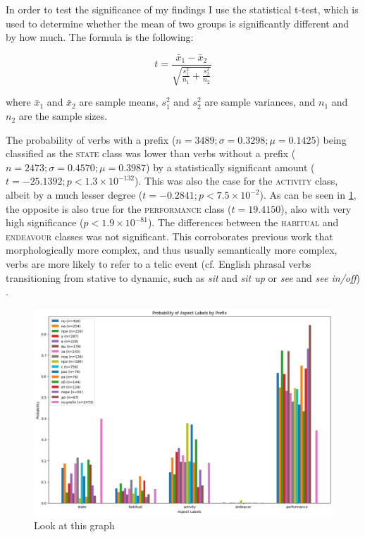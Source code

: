 In order to test the significance of my findings I use the statistical t-test, which is used to determine whether the mean of two groups is significantly different and by how much. The formula is the following:

$$t = \frac{\bar{x}_1 - \bar{x}_2}{\sqrt{\frac{s_1^2}{n_1} + \frac{s_2^2}{n_2}}}$$

where $\bar{x}_1$ and $\bar{x}_2$ are sample means, $s_1^2$ and $s_2^2$ are sample variances, and $n_1$ and $n_2$ are the sample sizes.

The probability of verbs with a prefix ($n=3489; \sigma = 0.3298; \mu = 0.1425$) being classified as the \textsc{state} class was lower than verbs without a prefix ($n=2473; \sigma = 0.4570; \mu = 0.3987$) by a statistically significant amount ($t = -25.1392; p < 1.3\times 10^{-132}$). This was also the case for the \textsc{activity} class, albeit by a much lesser degree ($t=-0.2841; p < 7.5\times 10^{-2}$). As can be seen in \ref{fig:fine-tuned_aspect_latent_space}, the opposite is also true for the \textsc{performance} class ($t=19.4150$), also with very high significance ($p<1.9\times 10^{-81}$). The differences between the \textsc{habitual} and \textsc{endeavour} classes was not significant. This corroborates previous work that morphologically more complex, and thus usually semantically more complex, verbs are more likely to refer to a telic event (cf. English phrasal verbs transitioning from stative to dynamic, such as \emph{sit} and \emph{sit up} or \emph{see} and \emph{see in/off}) \citep{iacobini_ital_phrasal_verbs, wee_wrtched_words_article, Walková+2017+589+616, telicity_parameter_revisited}.

\begin{figure}
    \includegraphics[width=\textwidth]{img/aspect_prediction_by_prefix.png}
    \caption{Look at this graph}
    \label{fig:fine-tuned_aspect_latent_space}
\end{figure}

